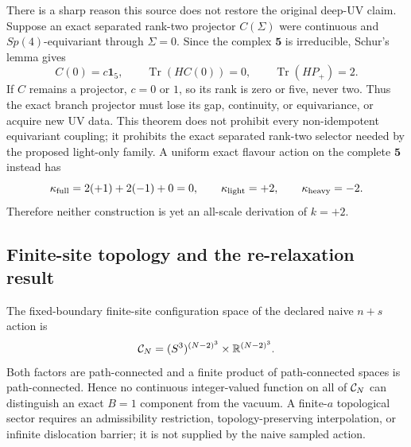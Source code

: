 \documentclass[11pt]{article}
\numberwithin{equation}{section}
\newcommand{\RR}{\mathbb R}
\newcommand{\Tr}{\operatorname{Tr}}
\begin{document}
There is a sharp reason this source does not restore the original deep-UV
claim.  Suppose an exact separated rank-two projector \(C(\Sigma)\) were
continuous and \(Sp(4)\)-equivariant through \(\Sigma=0\).  Since the complex
\(\bm5\) is irreducible, Schur's lemma gives
\begin{equation}
 C(0)=c\bm1_5,\qquad \Tr(HC(0))=0,\qquad
 \Tr(HP_+)=2.
 \label{eq:e7-schur-obstruction}
\end{equation}
If \(C\) remains a projector, \(c=0\) or \(1\), so its rank is zero or five,
never two.  Thus the exact branch projector must lose its gap, continuity, or
equivariance, or acquire new UV data.  This theorem does not prohibit every
non-idempotent equivariant coupling; it prohibits the exact separated
rank-two selector needed by the proposed light-only family.  A uniform exact
flavour action on the complete \(\bm5\) instead has
\begin{equation}
 \kappa_{\rm full}=2(+1)+2(-1)+0=0,\qquad
 \kappa_{\rm light}=+2,\qquad \kappa_{\rm heavy}=-2.
 \label{eq:e7-charge-trace}
\end{equation}
Therefore neither construction is yet an all-scale derivation of
\(k=+2\).

\subsection{Finite-site topology and the re-relaxation result}

The fixed-boundary finite-site configuration space of the declared naive
\(n+s\) action is
\begin{equation}
 {\cal C}_N=(S^3)^{(N-2)^3}\times\RR^{(N-2)^3}.
 \label{eq:e7-finite-config-space}
\end{equation}
Both factors are path-connected and a finite product of path-connected
spaces is path-connected.  Hence no continuous integer-valued function on
all of \({\cal C}_N\) can distinguish an exact \(B=1\) component from the
vacuum.  A finite-\(a\) topological sector requires an admissibility
restriction, topology-preserving interpolation, or infinite dislocation
barrier; it is not supplied by the naive sampled action.
\end{document}
